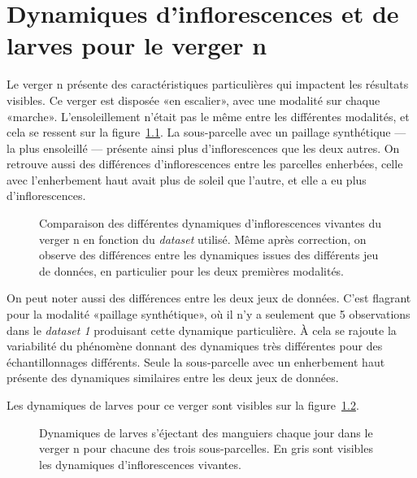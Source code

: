  \chapter{Dynamiques d'inflorescences et de larves pour le verger n}
 \label{chap:bloc2}
 
 Le verger n présente des caractéristiques particulières qui impactent les résultats visibles.
 Ce verger est disposée «en escalier», avec une modalité sur chaque «marche».
 L'ensoleillement n'était pas le même entre les différentes modalités, et cela se ressent sur la figure~\ref{fig:inflos2}.
 La sous-parcelle avec un paillage synthétique --- la plus ensoleillé --- présente ainsi plus d'inflorescences que les deux autres.
 On retrouve aussi des différences d'inflorescences entre les parcelles enherbées, celle avec l'enherbement haut avait plus de soleil que l'autre, et elle a eu plus d'inflorescences.
 
 \begin{figure}[ht]
\centering
{}
\caption{Comparaison des différentes dynamiques d'inflorescences vivantes du verger n en fonction du \emph{dataset} utilisé. Même après correction, on observe des différences entre les dynamiques issues des différents jeu de données, en particulier pour les deux premières modalités.}
\label{fig:inflos2}
\end{figure}
\newpage
 On peut noter aussi des différences entre les deux jeux de données. C'est flagrant pour la modalité «paillage synthétique», où il n'y a seulement que 5 observations dans le \emph{dataset 1} produisant cette dynamique particulière. À cela se rajoute la variabilité du phénomène donnant des dynamiques très différentes pour des échantillonnages différents. Seule la sous-parcelle avec un enherbement haut présente des dynamiques similaires entre les deux jeux de données.
 
 Les dynamiques de larves pour ce verger sont visibles sur la figure~\ref{fig:larves2}.
 
 \begin{figure}[ht]
\centering
{}
\caption{Dynamiques de larves s'éjectant des manguiers chaque jour dans le verger n pour chacune des trois sous-parcelles. En gris sont visibles les dynamiques d'inflorescences vivantes.}
\label{fig:larves2}
\end{figure}

